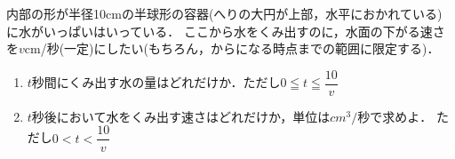 \documentclass[../../main.tex]{subfiles}
\begin{document}
内部の形が半径10cmの半球形の容器(へりの大円が上部，水平におかれている)に水がいっぱいはいっている．
ここから水をくみ出すのに，水面の下がる速さを$v$cm/秒(一定)にしたい(もちろん，からになる時点までの範囲に限定する)．
\begin{enumerate}
  \item $t$秒間にくみ出す水の量はどれだけか．ただし$\displaystyle 0 \leqq t \leqq \dfrac{10}{v}$
  \item $t$秒後において水をくみ出す速さはどれだけか，単位は${cm}^3/\text{秒}$で求めよ．
    ただし$\displaystyle 0<t<\dfrac{10}{v}$
\end{enumerate}
\end{document}
